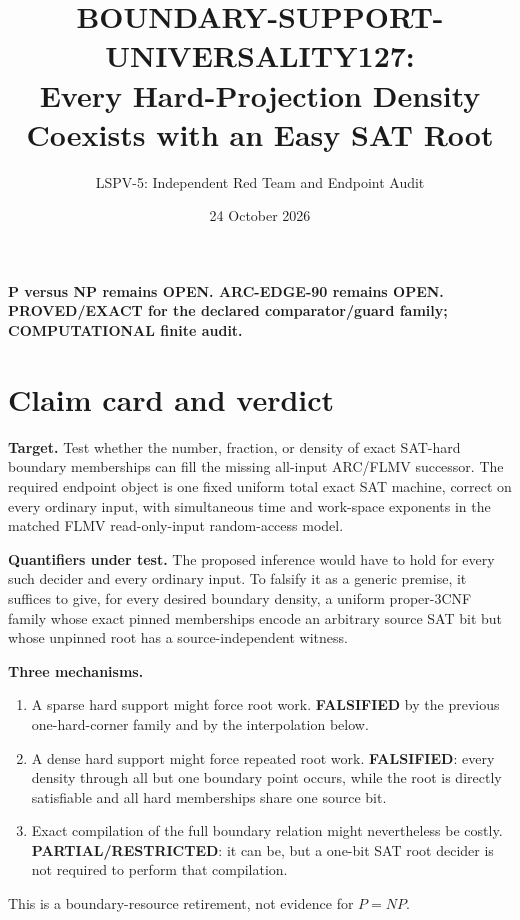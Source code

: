 \documentclass[11pt]{article}
\title{BOUNDARY-SUPPORT-UNIVERSALITY127:\\
Every Hard-Projection Density Coexists with an Easy SAT Root}
\author{LSPV-5: Independent Red Team and Endpoint Audit}
\date{24 October 2026}
\begin{document}
\maketitle

\begin{center}
\textbf{P versus NP remains OPEN. ARC-EDGE-90 remains OPEN.}\\
\textbf{PROVED/EXACT for the declared comparator/guard family; COMPUTATIONAL finite audit.}
\end{center}

\section{Claim card and verdict}
\textbf{Target.}  Test whether the number, fraction, or density of exact
SAT-hard boundary memberships can fill the missing all-input ARC/FLMV
successor.  The required endpoint object is one fixed uniform total exact
SAT machine, correct on every ordinary input, with simultaneous time and
work-space exponents in the matched FLMV read-only-input random-access
model.

\textbf{Quantifiers under test.}  The proposed inference would have to hold
for every such decider and every ordinary input.  To falsify it as a generic
premise, it suffices to give, for every desired boundary density, a uniform
proper-3CNF family whose exact pinned memberships encode an arbitrary source
SAT bit but whose unpinned root has a source-independent witness.

\textbf{Three mechanisms.}
\begin{enumerate}
\item A sparse hard support might force root work.  \textbf{FALSIFIED} by
the previous one-hard-corner family and by the interpolation below.
\item A dense hard support might force repeated root work.  \textbf{FALSIFIED}:
every density through all but one boundary point occurs, while the root is
directly satisfiable and all hard memberships share one source bit.
\item Exact compilation of the full boundary relation might nevertheless
be costly.  \textbf{PARTIAL/RESTRICTED}: it can be, but a one-bit SAT root
decider is not required to perform that compilation.
\end{enumerate}
This is a boundary-resource retirement, not evidence for $P=NP$.
\end{document}

